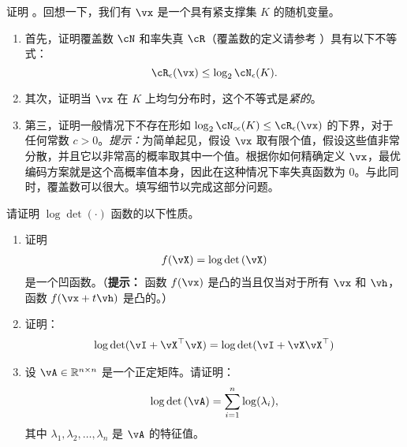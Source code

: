 \documentclass[../../book-main.tex]{subfiles}
\begin{document}
\begin{exercise}\label{exer:prop cover}
	证明 。回想一下，我们有 \(\vx\) 是一个具有紧支撑集 \(K\) 的随机变量。
	\begin{enumerate}
		\item 首先，证明覆盖数 \(\cN\) 和率失真 \(\cR\)（覆盖数的定义请参考 ）具有以下不等式：
		\begin{equation}
			\cR_{\epsilon}(\vx) \leq \log_{2} \cN_{\epsilon}(K).
		\end{equation}
		\item 其次，证明当 \(\vx\) 在 \(K\) 上均匀分布时，这个不等式是\textit{紧的}。
		\item 第三，证明一般情况下不存在形如 \(\log_{2} \cN_{c\epsilon}(K) \leq \cR_{\epsilon}(\vx)\) 的下界，对于任何常数 \(c > 0\)。\textit{提示：}为简单起见，假设 \(\vx\) 取有限个值，假设这些值非常分散，并且它以非常高的概率取其中一个值。根据你如何精确定义 \(\vx\)，最优编码方案就是这个高概率值本身，因此在这种情况下率失真函数为 \(0\)。与此同时，覆盖数可以很大。填写细节以完成这部分问题。
	\end{enumerate}
\end{exercise}

\begin{exercise}
	请证明 $\log\det(\cdot)$ 函数的以下性质。
	\begin{enumerate}
		\item 证明
		      \begin{align*}
			      f(\vX) = \log\det\left(\vX\right)
		      \end{align*}
		      是一个凹函数。（{\bf 提示：} 函数 $f(\vx)$ 是凸的当且仅当对于所有 $\vx$ 和 $\vh$，函数 $f(\vx+t\vh)$ 是凸的。）

		\item 证明：
		      \begin{align*}
			      \log\det(\vI + \vX^\top\vX) = \log\det(\vI + \vX\vX^\top)
		      \end{align*}

		\item 设 $\vA \in \R^{n\times n}$ 是一个正定矩阵。请证明：
		      \begin{align}
			      \log\det\left(\vA \right) = \sum_{i=1}^n \log(\lambda_i),
		      \end{align}
		      其中 $\lambda_1,\lambda_2,\dots,\lambda_n$ 是 $\vA$ 的特征值。
	\end{enumerate}

\end{exercise}


 
\end{document}
